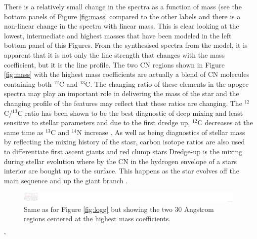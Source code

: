 \documentclass[12pt, preprint]{aastex}
\newcommand{\project}[1]{\textsl{#1}}
\newcommand{\tc}{\project{The~Cannon}}
\begin{document}
There is a relatively small change in the spectra as a function of mass (see the bottom panels of Figure \ref{fig:mass} compared to the other labels and there is a non-linear change in the spectra with linear mass. This is clear looking at the lowest, intermediate and highest masses that have been modeled in the left bottom panel of this Figures. From the synthesised spectra from the model, it is apparent that it is not only the line strength that changes with the mass coefficient, but it is the line profile. The two CN regions shown in Figure \ref{fig:mass} with the highest mass coefficients are actually a blend of CN molecules containing both $^{12}$C and $^{13}$C. The changing ratio of these elements in the apogee spectra may play an important role in delivering the mass of the star and the changing profile of the features may reflect that these ratios are changing. The $^{12}$C/$^{13}$C ratio has been shown to be the best diagnostic of deep mixing and least sensitive to stellar parameters and due to the first dredge up, $^{12}$C decreases at the same time as $^{13}$C and $^{14}$N increase \citep{Taut2010}.  As well as being diagnostics of stellar mass by reflecting the mixing history of the stasr, carbon isotope ratios are also used to differentiate first ascent giants and red clump stars \citep[see][and references therein]{Taut2013} Dredge-up is the mixing during stellar evolution where by the CN in the hydrogen envelope of a stars interior are bought up to the surface. This happens as the star evolves off the main sequence and up the giant branch \citep{Gilroy1991}. 




\begin{figure}[p!]
\centering
    \includegraphics[scale=0.51]{./plots/coeffs_m_3.png}
  \caption{Same as for Figure \ref{fig:logg} but showing the two 30 Angstrom regions centered at the highest mass coefficients.}
\label{fig:feha}
\end{figure}'
\end{document}

